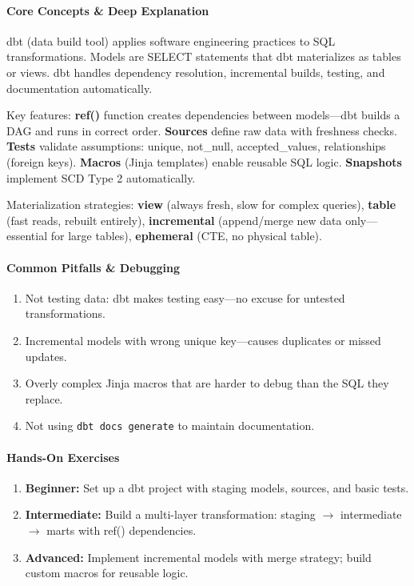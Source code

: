 \documentclass[11pt, a4paper, oneside]{report}
\newcommand{\arrow}{$\rightarrow$}
\begin{document}
\paragraph{Core Concepts \& Deep Explanation} dbt (data build tool) applies software engineering practices to SQL transformations. Models are SELECT statements that dbt materializes as tables or views. dbt handles dependency resolution, incremental builds, testing, and documentation automatically.

Key features: \textbf{ref()} function creates dependencies between models---dbt builds a DAG and runs in correct order. \textbf{Sources} define raw data with freshness checks. \textbf{Tests} validate assumptions: unique, not\_null, accepted\_values, relationships (foreign keys). \textbf{Macros} (Jinja templates) enable reusable SQL logic. \textbf{Snapshots} implement SCD Type 2 automatically.

Materialization strategies: \textbf{view} (always fresh, slow for complex queries), \textbf{table} (fast reads, rebuilt entirely), \textbf{incremental} (append/merge new data only---essential for large tables), \textbf{ephemeral} (CTE, no physical table).

\paragraph{Common Pitfalls \& Debugging}
\begin{enumerate}[leftmargin=*]
\item Not testing data: dbt makes testing easy---no excuse for untested transformations.
\item Incremental models with wrong unique key---causes duplicates or missed updates.
\item Overly complex Jinja macros that are harder to debug than the SQL they replace.
\item Not using \texttt{dbt docs generate} to maintain documentation.
\end{enumerate}

\paragraph{Hands-On Exercises}
\begin{enumerate}[leftmargin=*]
\item \textbf{Beginner:} Set up a dbt project with staging models, sources, and basic tests.
\item \textbf{Intermediate:} Build a multi-layer transformation: staging \arrow{} intermediate \arrow{} marts with ref() dependencies.
\item \textbf{Advanced:} Implement incremental models with merge strategy; build custom macros for reusable logic.
\end{enumerate}
\end{document}
